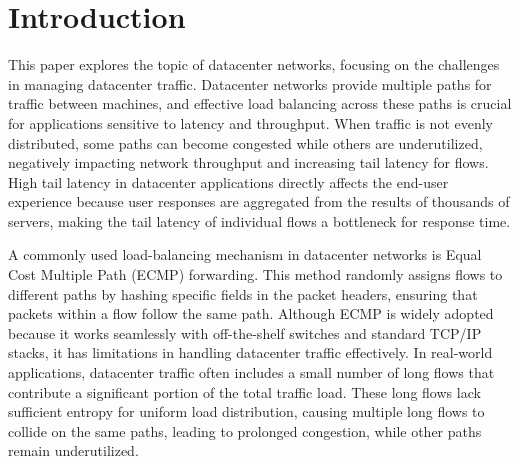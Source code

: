 \documentclass[11pt, sigconf]{acmart}
\begin{document}
\section{Introduction}
\begin{comment}ACM's consolidated article template, introduced in 2017, provides a
consistent \LaTeX\ style for use across ACM publications, and
incorporates accessibility and metadata-extraction functionality
necessary for future Digital Library endeavors. Numerous ACM and
SIG-specific \LaTeX\ templates have been examined, and their unique
features incorporated into this single new template.

If you are new to publishing with ACM, this document is a valuable
guide to the process of preparing your work for publication. If you
have published with ACM before, this document provides insight and
instruction into more recent changes to the article template.

The ``\verb|acmart|'' document class can be used to prepare articles
for any ACM publication --- conference or journal, and for any stage
of publication, from review to final ``camera-ready'' copy, to the
author's own version, with {\itshape very} few changes to the source.
\end{comment}
This paper explores the topic of datacenter networks, focusing on the challenges in managing datacenter traffic. Datacenter networks provide multiple paths for traffic between machines, and effective load balancing across these paths is crucial for applications sensitive to latency and throughput. When traffic is not evenly distributed, some paths can become congested while others are underutilized, negatively impacting network throughput and increasing tail latency for flows. High tail latency in datacenter applications directly affects the end-user experience because user responses are aggregated from the results of thousands of servers, making the tail latency of individual flows a bottleneck for response time.

A commonly used load-balancing mechanism in datacenter networks is Equal Cost Multiple Path (ECMP) forwarding. This method randomly assigns flows to different paths by hashing specific fields in the packet headers, ensuring that packets within a flow follow the same path. Although ECMP is widely adopted because it works seamlessly with off-the-shelf switches and standard TCP/IP stacks, it has limitations in handling datacenter traffic effectively. In real-world applications, datacenter traffic often includes a small number of long flows that contribute a significant portion of the total traffic load. These long flows lack sufficient entropy for uniform load distribution, causing multiple long flows to collide on the same paths, leading to prolonged congestion, while other paths remain underutilized.
\end{document}
